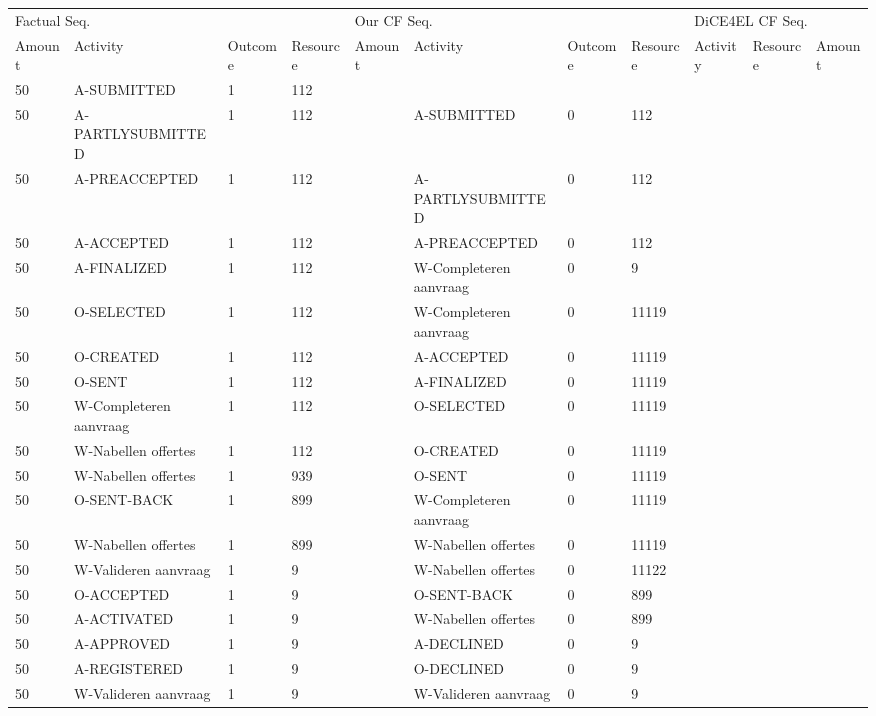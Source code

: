 \begin{tabular}{lllllllllll}
\toprule
\multicolumn{4}{l}{Factual Seq.} & \multicolumn{4}{l}{Our CF Seq.} & \multicolumn{3}{l}{DiCE4EL CF Seq.} \\
Amount & Activity & Outcome & Resource & Amount & Activity & Outcome & Resource & Activity & Resource & Amount \\
\midrule
50 & A-SUBMITTED & 1 & 112 &  &  &  &  &  &  &  \\
50 & A-PARTLYSUBMITTED & 1 & 112 &  & A-SUBMITTED & 0 & 112 &  &  &  \\
50 & A-PREACCEPTED & 1 & 112 &  & A-PARTLYSUBMITTED & 0 & 112 &  &  &  \\
50 & A-ACCEPTED & 1 & 112 &  & A-PREACCEPTED & 0 & 112 &  &  &  \\
50 & A-FINALIZED & 1 & 112 &  & W-Completeren aanvraag & 0 & 9 &  &  &  \\
50 & O-SELECTED & 1 & 112 &  & W-Completeren aanvraag & 0 & 11119 &  &  &  \\
50 & O-CREATED & 1 & 112 &  & A-ACCEPTED & 0 & 11119 &  &  &  \\
50 & O-SENT & 1 & 112 &  & A-FINALIZED & 0 & 11119 &  &  &  \\
50 & W-Completeren aanvraag & 1 & 112 &  & O-SELECTED & 0 & 11119 &  &  &  \\
50 & W-Nabellen offertes & 1 & 112 &  & O-CREATED & 0 & 11119 &  &  &  \\
50 & W-Nabellen offertes & 1 & 939 &  & O-SENT & 0 & 11119 &  &  &  \\
50 & O-SENT-BACK & 1 & 899 &  & W-Completeren aanvraag & 0 & 11119 &  &  &  \\
50 & W-Nabellen offertes & 1 & 899 &  & W-Nabellen offertes & 0 & 11119 &  &  &  \\
50 & W-Valideren aanvraag & 1 & 9 &  & W-Nabellen offertes & 0 & 11122 &  &  &  \\
50 & O-ACCEPTED & 1 & 9 &  & O-SENT-BACK & 0 & 899 &  &  &  \\
50 & A-ACTIVATED & 1 & 9 &  & W-Nabellen offertes & 0 & 899 &  &  &  \\
50 & A-APPROVED & 1 & 9 &  & A-DECLINED & 0 & 9 &  &  &  \\
50 & A-REGISTERED & 1 & 9 &  & O-DECLINED & 0 & 9 &  &  &  \\
50 & W-Valideren aanvraag & 1 & 9 &  & W-Valideren aanvraag & 0 & 9 &  &  &  \\
\bottomrule
\end{tabular}
